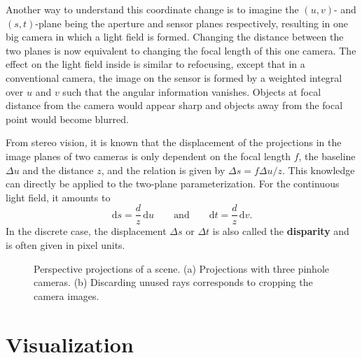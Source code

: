 Another way to understand this coordinate change is to imagine the $(u, v)$- and $(s, t)$-plane being the aperture and sensor planes respectively, resulting in one big camera in which a light field is formed.
Changing the distance between the two planes is now equivalent to changing the focal length of this one camera.
The effect on the light field inside is similar to refocusing, except that in a conventional camera, the image on the sensor is formed by a weighted integral over $u$ and $v$ such that the angular information vanishes.
Objects at focal distance from the camera would appear sharp and objects away from the focal point would become blurred.


From stereo vision, it is known that the displacement of the projections in the image planes of two cameras is only dependent on the focal length $f$, the baseline $\Delta u$ and the distance $z$, and the relation is given by $\Delta s = f \Delta u / z$.
This knowledge can directly be applied to the two-plane parameterization. 
For the continuous light field, it amounts to
\begin{equation}
	\textrm{d}s = \frac{d}{z} \, \textrm{d}u 
	\qquad
	\text{and} 
	\qquad
	\textrm{d}t = \frac{d}{z} \, \textrm{d}v.
\end{equation}
In the discrete case, the displacement $\Delta s$ or $\Delta t$ is also called the \textbf{disparity} and is often given in pixel units.

\begin{figure}[tb]
	\subfigure[]{
		\centering
		
		\label{fig:ShiftedPerspectiveProjection}
	}
	\hfill
	\subfigure[]{
		\centering
		
		\label{fig:RectifiedPerspectiveProjection}
	}
	\caption{Perspective projections of a scene. 
			 (a) Projections with three pinhole cameras. 
			 (b) Discarding unused rays corresponds to cropping the camera images.}
\end{figure}


\section{Visualization}
\label{sec:Visualization}

